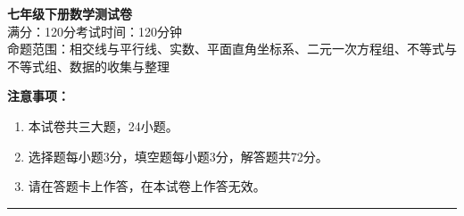 \documentclass[12pt, a4paper]{ctexart}
\begin{document}
\begin{center}
{\LARGE\bfseries 七年级下册数学测试卷}\\[8pt]
{\large 满分：120分\quad 考试时间：120分钟}\\[4pt]
{\normalsize 命题范围：相交线与平行线、实数、平面直角坐标系、二元一次方程组、不等式与不等式组、数据的收集与整理}
\end{center}

\vspace{4pt}
\noindent\textbf{注意事项：}
\begin{enumerate}[leftmargin=2em]
\item 本试卷共三大题，24小题。
\item 选择题每小题3分，填空题每小题3分，解答题共72分。
\item 请在答题卡上作答，在本试卷上作答无效。
\end{enumerate}

\vspace{6pt}
\noindent\rule{\textwidth}{0.8pt}

\vspace{8pt}

\vspace{6pt}
\end{document}
